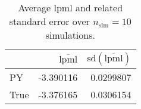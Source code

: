 \begin{table}[H]

\caption{Average lpml and related standard error over $n_{\text{sim}} = 10$ simulations.}
\centering
\begin{tabular}[t]{lrr}
\toprule
  & $\overbar{\text{lpml}}$ & $\text{sd}(\overbar{\text{lpml}})$\\
\midrule
PY & -3.390116 & 0.0299807\\
True & -3.376165 & 0.0306154\\
\bottomrule
\end{tabular}
\end{table}